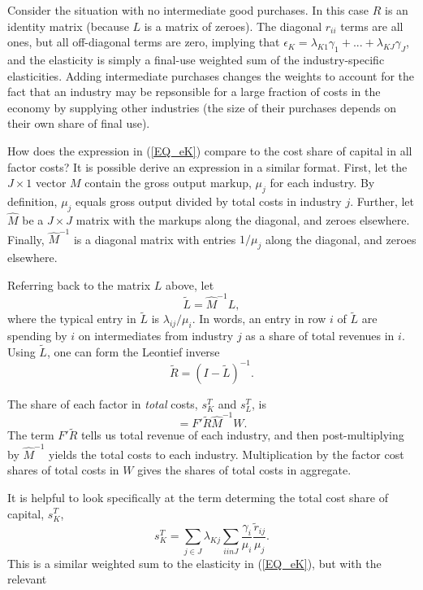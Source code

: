 Consider the situation with no intermediate good purchases. In this case $R$ is an identity matrix (because $L$ is a matrix of zeroes). The diagonal $r_{ii}$ terms are all ones, but all off-diagonal terms are zero, implying that $\epsilon_K = \lambda_{K1}\gamma_1 + ... + \lambda_{KJ}\gamma_J$, and the elasticity is simply a final-use weighted sum of the industry-specific elasticities. Adding intermediate purchases changes the weights to account for the fact that an industry may be repsonsible for a large fraction of costs in the economy by supplying other industries (the size of their purchases depends on their own share of final use). 

How does the expression in (\ref{EQ_eK}) compare to the cost share of capital in all factor costs? It is possible derive an expression in a similar format. First, let the $J \times 1$ vector $M$ contain the gross output markup, $\mu_j$ for each industry. By definition, $\mu_j$ equals gross output divided by total costs in industry $j$. Further, let $\hat{M}$ be a $J \times J$ matrix with the markups along the diagonal, and zeroes elsewhere. Finally, $\hat{M}^{-1}$ is a diagonal matrix with entries $1/\mu_j$ along the diagonal, and zeroes elsewhere. 

Referring back to the matrix $L$ above, let 
\begin{equation}
	\tilde{L} = \hat{M}^{-1}L,
\end{equation}
where the typical entry in $\tilde{L}$ is $\lambda_{ij}/\mu_i$. In words, an entry in row $i$ of $\tilde{L}$ are spending by $i$ on intermediates from industry $j$ as a share of total revenues in $i$. Using $\tilde{L}$, one can form the Leontief inverse
\begin{equation}
	\tilde{R} = (I - \tilde{L})^{-1}. 
\end{equation}

The share of each factor in \textit{total} costs, $s^T_K$ and $s^T_L$, is
\begin{equation}
	[s^T_K \text{ } s^T_L] = F'\tilde{R}\hat{M}^{-1}W.
\end{equation}
The term $F'\tilde{R}$ tells us total revenue of each industry, and then post-multiplying by $\hat{M}^{-1}$ yields the total costs to each industry. Multiplication by the factor cost shares of total costs in $W$ gives the shares of total costs in aggregate. 

It is helpful to look specifically at the term determing the total cost share of capital, $s^T_K$,
\begin{equation}
	s^T_K = \sum_{j \in J} \lambda_{Kj} \sum_{i in J} \frac{\gamma_i}{\mu_i} \frac{\tilde{r}_{ij}}{\mu_j}. \label{EQ_sTK}
\end{equation}
This is a similar weighted sum to the elasticity in (\ref{EQ_eK}), but with the relevant 



